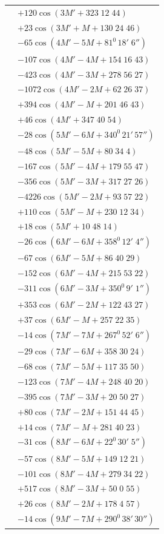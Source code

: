 \begin{landscape}
\begin{longtable}{@{}r@{}l@{}}
&\(+120\cos(3M'+323\;12\;44)\)\\
&\(+23\cos(3M'+M+130\;24\;46)\)\\[3pt]
&\(-65\cos(4M'-5M+81^0\,18'\;6'')\)\\
&\(-107\cos(4M'-4M+154\;16\;43)\)\\
&\(-423\cos(4M'-3M+278\;56\;27)\)\\
&\(-1072\cos(4M'-2M+62\;26\;37)\)\\
&\(+394\cos(4M'-M+201\;46\;43)\)\\
&\(+46\cos(4M'+347\;40\;54)\)\\[3pt]
&\(-28\cos(5M'-6M+340^0\,21'\,57'')\)\\
&\(-48\cos(5M'-5M+80\;34\;4)\)\\
&\(-167\cos(5M'-4M+179\;55\;47)\)\\
&\(-356\cos(5M'-3M+317\;27\;26)\)\\
&\(-4226\cos(5M'-2M+93\;57\;22)\)\\
&\(+110\cos(5M'-M+230\;12\;34)\)\\
&\(+18\cos(5M'+10\;48\;14)\)\\[3pt]
&\(-26\cos(6M'-6M+358^0\,12'\;4'')\)\\
&\(-67\cos(6M'-5M+86\;40\;29)\)\\
&\(-152\cos(6M'-4M+215\;53\;22)\)\\
&\(-311\cos(6M'-3M+350^0\,9'\;1'')\)\\
&\(+353\cos(6M'-2M+122\;43\;27)\)\\
&\(+37\cos(6M'-M+257\;22\;35)\)\\[3pt]
&\(-14\cos(7M'-7M+267^0\,52'\;6'')\)\\
&\(-29\cos(7M'-6M+358\;30\;24)\)\\
&\(-68\cos(7M'-5M+117\;35\;50)\)\\
&\(-123\cos(7M'-4M+248\;40\;20)\)\\
&\(-395\cos(7M'-3M+20\;50\;27)\)\\
&\(+80\cos(7M'-2M+151\;44\;45)\)\\
&\(+14\cos(7M'-M+281\;40\;23)\)\\[3pt]
&\(-31\cos(8M'-6M+22^0\,30'\;5'')\)\\
&\(-57\cos(8M'-5M+149\;12\;21)\)\\
&\(-101\cos(8M'-4M+279\;34\;22)\)\\
&\(+517\cos(8M'-3M+50\;0\;55)\)\\
&\(+26\cos(8M'-2M+178\;4\;57)\)\\[3pt]
&\(-14\cos(9M'-7M+290^0\,38'\,30'')\)\\

\end{longtable}
\end{landscape}
